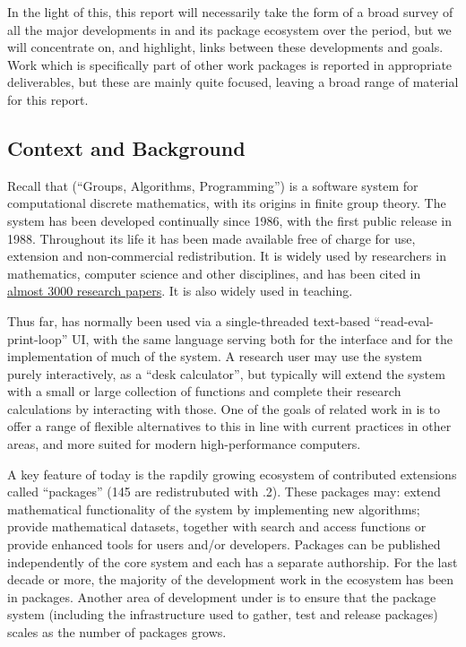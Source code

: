 \documentclass{deliverablereport}
\begin{document}
In the light of this, this report will necessarily take the form of  a broad
survey of all the major developments in \GAP and its package ecosystem
over the period, but we will concentrate on, and highlight, links between
these developments and \ODK goals. Work which is specifically part of
other work packages is reported in appropriate deliverables, but these
are mainly quite focused, leaving a broad range of material for this report.

\subsection{Context and Background}

Recall that \GAP (``Groups, Algorithms, Programming'') is a software system for
computational discrete mathematics, with its origins in finite group
theory. The system has been developed continually since 1986, with the
first public release in 1988. Throughout its life it has been made
available free of charge for use, extension and non-commercial
redistribution. It is widely used by researchers in mathematics,
computer science and other disciplines, and has been cited in
\href{https://www.gap-system.org/Doc/Bib/bib.html}{almost 3000
  research papers}. It is also widely used in teaching.


Thus far, \GAP has
normally been used via a single-threaded text-based ``read-eval-print-loop'' UI, with the
same \GAP language serving both for the interface and for the
implementation of much of the system. A research user 
may use the system purely interactively, as a ``desk calculator'', but
typically will extend the system with a small or large collection of
\GAP functions and complete their research calculations by interacting
with those. One of the goals of \GAP related work in \ODK is to offer
a range of flexible alternatives to this in line with current
practices in other areas, and more suited for modern high-performance
computers.

A key feature of \GAP today is the rapdily growing ecosystem of
contributed extensions called ``packages'' (145 are redistrubuted with
.2). These packages may: extend mathematical functionality of
the system by implementing new algorithms; provide mathematical
datasets, together with search and access functions or provide
enhanced tools for users and/or developers. Packages can be published
independently of the core \GAP system and each has a separate
authorship. For the last decade or more, the majority of the
development work in the \GAP ecosystem has been in packages.
Another area of \GAP development under \ODK is to ensure
that the package system (including the infrastructure used to gather,
test and release packages) scales as the number of packages grows.
\end{document}
